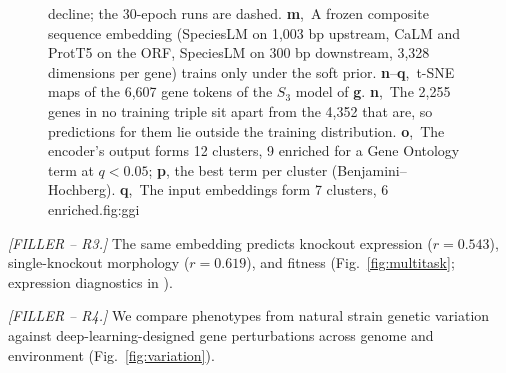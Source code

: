 \begin{figure}[t]
{decline; the 30-epoch runs are dashed.
\textbf{m},~A frozen composite sequence embedding (SpeciesLM on 1,003 bp upstream, CaLM and
ProtT5 on the ORF, SpeciesLM on 300 bp downstream, 3,328 dimensions per gene) trains only under
the soft prior.
\textbf{n}--\textbf{q},~t-SNE maps of the 6,607 gene tokens of the $S_3$ model of \textbf{g}.
\textbf{n},~The 2,255 genes in no training triple sit apart from the 4,352 that are, so
predictions for them lie outside the training distribution.
\textbf{o},~The encoder's output forms 12 clusters, 9 enriched for a Gene Ontology term at
$q < 0.05$; \textbf{p}, the best term per cluster (Benjamini--Hochberg).
\textbf{q},~The input embeddings form 7 clusters, 6 enriched.}{fig:ggi}
\end{figure}
\FloatBarrier

\textit{[FILLER -- R3.]} The same embedding predicts knockout expression ($r = 0.543$),
single-knockout morphology ($r = 0.619$), and fitness (Fig.~\ref{fig:multitask};
expression diagnostics in ).

\begin{figure}[t]
\end{figure}
\FloatBarrier

\textit{[FILLER -- R4.]} We compare phenotypes from natural strain genetic variation against
deep-learning-designed gene perturbations across genome and environment
(Fig.~\ref{fig:variation}).

\begin{figure}[t]
\end{figure}
\FloatBarrier

